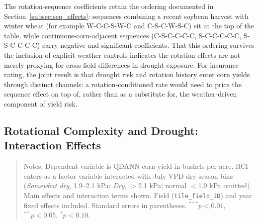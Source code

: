 \documentclass[12pt,letterpaper]{article}
\theoremstyle{remark}
\theoremstyle{remark}
\theoremstyle{plain}
\theoremstyle{definition}
\begin{document}
The rotation-sequence coefficients retain the ordering documented in
Section~\ref{subsec:seq_effects}: sequences combining a recent soybean harvest
with winter wheat (for example W-C-C-S-W-C and C-S-C-W-S-C) sit at the top of the
table, while continuous-corn-adjacent sequences (C-S-C-C-C-C, S-C-C-C-C-C,
S-S-C-C-C-C) carry negative and significant coefficients. That this ordering
survives the inclusion of explicit weather controls indicates the rotation
effects are not merely proxying for cross-field differences in drought exposure.
For insurance rating, the joint result is that drought risk and rotation history
enter corn yields through distinct channels: a rotation-conditioned rate would
need to price the sequence effect on top of, rather than as a substitute for, the
weather-driven component of yield risk.

\subsection{\label{subsec:rci_vpd_effects}Rotational Complexity and Drought: Interaction Effects}


\begin{quote}
\small
Notes: Dependent variable is QDANN corn yield in bushels per acre. RCI enters as
a factor variable interacted with July VPD dry-season bins (\emph{Somewhat dry},
1.9--2.1 kPa; \emph{Dry}, $>$2.1 kPa; normal $<$1.9 kPa omitted). Main effects
and interaction terms shown. Field (\texttt{tile\_field\_ID}) and year fixed
effects included. Standard errors in parentheses. $^{***}p<0.01$,
$^{**}p<0.05$, $^{*}p<0.10$.
\end{quote}
\end{document}
